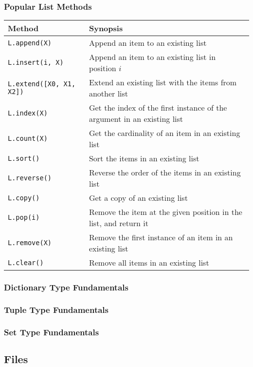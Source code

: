 \documentclass[aspectratio=1610]{beamer}
\begin{document}
\begin{frame}
    \frametitle{Popular List Methods}
    \begin{table}[!htbp]
    	\centering
        \small
    	\begin{tabular}{lp{10cm}}
    		\toprule \toprule
    		Method & Synopsis \\
    		\midrule 
    		\texttt{L.append(X)} & Append an item to an existing list\\
    		\texttt{L.insert(i, X)} & Append an item to an existing list in position $i$ \\
    		\texttt{L.extend([X0, X1, X2])} & Extend an existing list with the items from another list\\
    		\texttt{L.index(X)} & Get the index of the first instance of the argument in an existing list\\
    		\texttt{L.count(X)} & Get the cardinality of an item in an existing list\\
    		\texttt{L.sort()} & Sort the items in an existing list\\
    		\texttt{L.reverse()} & Reverse the order of the items in an existing list\\
    		\texttt{L.copy()} & Get a copy of an existing list\\
    		\texttt{L.pop(i)} & Remove the item at the given position in the list, and return it\\
    		\texttt{L.remove(X)} & Remove the first instance of an item in an existing list\\
    		\texttt{L.clear()} & Remove all items in an existing list\\
    		\bottomrule 
    	\end{tabular}
    \end{table}
\end{frame}


\begin{frame}
    \frametitle{Dictionary Type Fundamentals}
\end{frame}

\begin{frame}
    \frametitle{Tuple Type Fundamentals}
\end{frame}

\begin{frame}
    \frametitle{Set Type Fundamentals}
\end{frame}

\subsection{Files}
\end{document}
